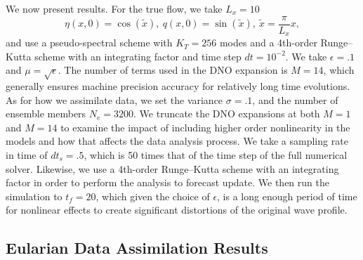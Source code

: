 We now present results.  For the true flow, we take $L_{x}=10$
\[
\eta(x,0) = \cos(\tilde{x}), ~ q(x,0) = \sin(\tilde{x}), ~ \tilde{x} = \frac{\pi}{L_{x}}x,
\]
and use a pseudo-spectral scheme with $K_{T}=256$ modes and a 4th-order Runge--Kutta scheme with an integrating factor and time step $dt=10^{-2}$. We take $\epsilon=.1$ and $\mu=\sqrt{\epsilon}$.  The number of terms used in the DNO expansion is $M=14$, which generally ensures machine precision accuracy for relatively long time evolutions.  As for how we assimilate data, we set the variance $\sigma=.1$, and the number of ensemble members $N_{e}=3200$.  We truncate the DNO expansions at both $M=1$ and $M=14$ to examine the impact of including higher order nonlinearity in the models and how that affects the data analysis process.  We take a sampling rate in time of $dt_{s}=.5$, which is 50 times that of the time step of the full numerical solver.  Likewise, we use a 4th-order Runge--Kutta scheme with an integrating factor in order to perform the analysis to forecast update.  We then run the simulation to $t_{f}=20$, which given the choice of $\epsilon$, is a long enough period of time for nonlinear effects to create significant distortions of the original wave profile.   

\subsection*{Eularian Data Assimilation Results}


